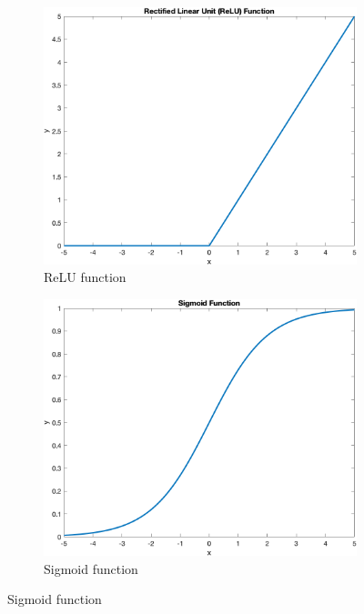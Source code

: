 \begin{figure}
    \centering
    \begin{subfigure}[b]{0.4\textwidth}
        \includegraphics[width=\textwidth]{figures/relu}
        \caption{ReLU function}
        \label{fig:relu}
    \end{subfigure}
    \hspace{0.1\textwidth}
    \begin{subfigure}[b]{0.4\textwidth}
        \includegraphics[width=\textwidth]{figures/sigmoid}
        \caption{Sigmoid function}
        \label{fig:sigmoid}

\end{subfigure}
\end{figure}
